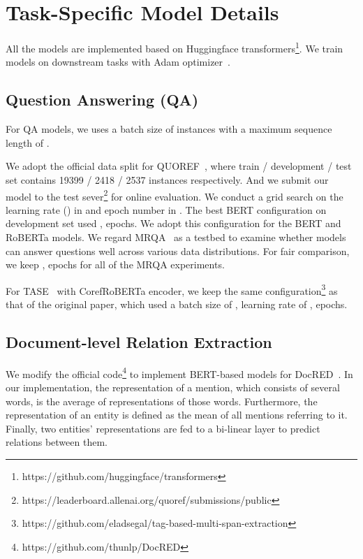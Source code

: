 \documentclass[11pt,a4paper]{article}
\newcommand\BASESIZE{\xspace}
\newcommand\LARGESIZE{\xspace}
\begin{document}
\section{Task-Specific Model Details}


All the models are implemented based on Huggingface transformers\footnote{https://github.com/huggingface/transformers}. We train models on downstream tasks with Adam optimizer~\citep{Adam}. 


\subsection{Question Answering (QA)}

For QA models, we uses a batch size of  instances with a maximum sequence length of . 

We adopt the official data split for QUOREF~\citep{QUOREF}, where train / development / test set contains 19399 / 2418 / 2537 instances respectively. And we submit our model to the test sever\footnote{https://leaderboard.allenai.org/quoref/submissions/public} for online evaluation.  We conduct a grid search on the learning rate () in   and epoch number in . The best BERT\BASESIZE configuration on development set used ,  epochs.  We adopt this configuration for the BERT\LARGESIZE and RoBERTa\LARGESIZE models. 
We regard MRQA~\citep{MRQA} as a testbed to examine whether models can answer questions well across various data distributions. For fair comparison, we keep ,  epochs for all of the MRQA experiments.

For TASE~\citep{TASE} with CorefRoBERTa encoder, we keep the same configuration\footnote{https://github.com/eladsegal/tag-based-multi-span-extraction} as that of the original paper, which used a batch size of , learning rate of ,  epochs. 



\subsection{Document-level Relation Extraction}

We modify the official code\footnote{https://github.com/thunlp/DocRED} to implement BERT-based models for DocRED~\citep{DocRED}. In our implementation, the representation of a mention, which consists of several words, is the average of  representations of those words. Furthermore, the representation of an entity is defined as the mean of all  mentions referring to it. Finally, two entities' representations are fed to a bi-linear layer to predict relations between them.
\end{document}
